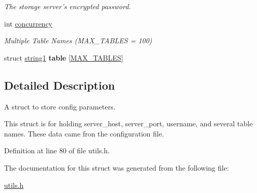 \begin{DoxyCompactItemize}
\begin{DoxyCompactList}\small\item\em The storage server's encrypted password. \end{DoxyCompactList}\item 
\hypertarget{structconfig__params_a558fd63cba5d55cdb271c49d432a88fa}{int \hyperlink{structconfig__params_a558fd63cba5d55cdb271c49d432a88fa}{concurrency}}\label{structconfig__params_a558fd63cba5d55cdb271c49d432a88fa}

\begin{DoxyCompactList}\small\item\em Multiple Table Names (M\-A\-X\-\_\-\-T\-A\-B\-L\-E\-S = 100) \end{DoxyCompactList}\item 
\hypertarget{structconfig__params_ae4fd315a9294c048d68497bac322db26}{struct \hyperlink{structstring1}{string1} {\bfseries table} \mbox{[}\hyperlink{storage_8h_a6f4cdd0162e9f2ab251fa5b23410c8da}{M\-A\-X\-\_\-\-T\-A\-B\-L\-E\-S}\mbox{]}}\label{structconfig__params_ae4fd315a9294c048d68497bac322db26}

\end{DoxyCompactItemize}


\subsection{Detailed Description}
A struct to store config parameters. 

This struct is for holding server\-\_\-host, server\-\_\-port, username, and several table names. These data came fron the configuration file. 

Definition at line 80 of file utils.\-h.



The documentation for this struct was generated from the following file\-:\begin{DoxyCompactItemize}
\item 
\hyperlink{utils_8h}{utils.\-h}\end{DoxyCompactItemize}
